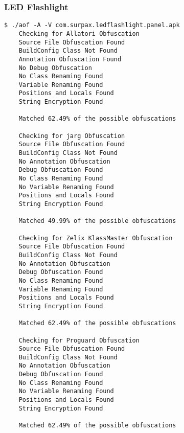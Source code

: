 \subsubsection{LED Flashlight \cite{flashlight}}
\label{app:lflash}
\begin{lstlisting}
$ ./aof -A -V com.surpax.ledflashlight.panel.apk
    Checking for Allatori Obfuscation
	Source File Obfuscation Found
	BuildConfig Class Not Found
	Annotation Obfuscation Found
	No Debug Obfuscation
	No Class Renaming Found
	Variable Renaming Found
	Positions and Locals Found
	String Encryption Found

	Matched 62.49% of the possible obfuscations

    Checking for jarg Obfuscation
	Source File Obfuscation Found
	BuildConfig Class Not Found
	No Annotation Obfuscation
	Debug Obfuscation Found
	No Class Renaming Found
	No Variable Renaming Found
	Positions and Locals Found
	String Encryption Found

	Matched 49.99% of the possible obfuscations

    Checking for Zelix KlassMaster Obfuscation
	Source File Obfuscation Found
	BuildConfig Class Not Found
	No Annotation Obfuscation
	Debug Obfuscation Found
	No Class Renaming Found
	Variable Renaming Found
	Positions and Locals Found
	String Encryption Found

	Matched 62.49% of the possible obfuscations

    Checking for Proguard Obfuscation
	Source File Obfuscation Found
	BuildConfig Class Not Found
	No Annotation Obfuscation
	Debug Obfuscation Found
	No Class Renaming Found
	No Variable Renaming Found
	Positions and Locals Found
	String Encryption Found

	Matched 62.49% of the possible obfuscations
\end{lstlisting}
\newpage
